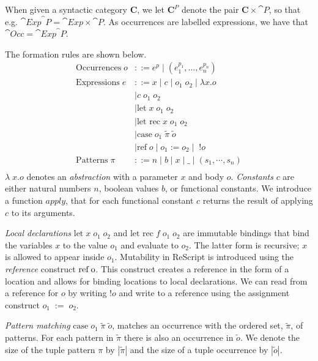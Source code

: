 \documentclass[acmsmall,sigplan]{acmart}
\begin{document}
When given a syntactic category $\mathbf{C}$, we let $\mathbf{C}^{P}$
denote the pair $\mathbf{C}\times\cat{P}$, so that e.g.
$\cat{Exp}^\cat{P}=\cat{Exp}\times\cat{P}$. As occurrences are
labelled expressions, we have that $\cat{Occ}=\cat{Exp}^\cat{P}$.

The formation rules are shown below.
%
\begin{align*}
  \text{Occurrences} \; o &::= e^p \mid (e^{p_1}_1, \ldots,
                                 e^{p_n}_n) \\[5mm]
\text{Expressions} \; e &::= x \mid c \mid o_1\;o_2 \mid \lambda x.o\\
			& \mid c \; o_1 \; o_2\\
			& \mid \mbox{let} \; x \; o_1 \; o_2 \\
			& \mid \mbox{let rec} \; x \; o_1 \; o_2 \\
			& \mid \mbox{case} \; o_1 \; \tilde{\pi} \; \tilde{o}\\
			& \mid \mbox{ref} \; o \mid o_1 := o_2 \mid \; !o\\[5mm]
  \text{Patterns} \; \pi &::= n \mid b \mid x \mid \_  \mid
                                (s_1,\cdots,s_n)\\
\end{align*}
%
$\lambda\;x.o$ denotes an \emph{abstraction} with a parameter $x$ and body $o$.
\emph{Constants} $c$ are either natural numbers $n$, boolean values $b$, or functional constants.
		We introduce a function $apply$, that for each functional constant $c$ returns the result of applying $c$ to its arguments.

\emph{Local declarations} $\mbox{let} \; x \; o_1 \; o_2$ and
$\mbox{let rec} \; f \; o_1 \; o_2$ are immutable bindings that bind
the variables $x$ to the value $o_1$ and evaluate to $o_2$. The latter
form is recursive; $x$ is allowed to appear inside $o_1$. Mutability
in ReScript is introduced using the \emph{reference} construct
$\mbox{ref\;o}$. This construct creates a reference in the form of a
location and allows for binding locations to local declarations. We
can read from a reference for $o$ by writing $!o$ and write to a
reference using the assignment construct $o_1\;:=\;o_2$. 

\emph{Pattern matching} $\mbox{case} \; o_1 \; \tilde{\pi} \; \tilde{o}$, matches an
occurrence with the ordered set, $\tilde{\pi}$, of patterns. For each
pattern in $\tilde{\pi}$ there is also an occurrence in $\tilde{o}$.
We denote the size of the tuple pattern $\pi$ by $|\tilde{\pi}|$ and
the size of a tuple occurrence by $|\tilde{o}|$.
\end{document}

